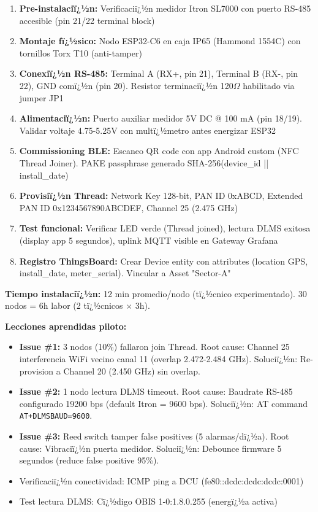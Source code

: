 \begin{enumerate}
    \item \textbf{Pre-instalaciï¿½n:} Verificaciï¿½n medidor Itron SL7000 con puerto RS-485 accesible (pin 21/22 terminal block)
    \item \textbf{Montaje fï¿½sico:} Nodo ESP32-C6 en caja IP65 (Hammond 1554C) con tornillos Torx T10 (anti-tamper)
    \item \textbf{Conexiï¿½n RS-485:} Terminal A (RX+, pin 21), Terminal B (RX-, pin 22), GND comï¿½n (pin 20). Resistor terminaciï¿½n 120$\Omega$ habilitado via jumper JP1
    \item \textbf{Alimentaciï¿½n:} Puerto auxiliar medidor 5V DC @ 100 mA (pin 18/19). Validar voltaje 4.75-5.25V con multï¿½metro antes energizar ESP32
    \item \textbf{Commissioning BLE:} Escaneo QR code con app Android custom (NFC Thread Joiner). PAKE passphrase generado SHA-256(device\_id || install\_date)
    \item \textbf{Provisiï¿½n Thread:} Network Key 128-bit, PAN ID 0xABCD, Extended PAN ID 0x1234567890ABCDEF, Channel 25 (2.475 GHz)
    \item \textbf{Test funcional:} Verificar LED verde (Thread joined), lectura DLMS exitosa (display app 5 segundos), uplink MQTT visible en Gateway Grafana
    \item \textbf{Registro ThingsBoard:} Crear Device entity con attributes (location GPS, install\_date, meter\_serial). Vincular a Asset "Sector-A"
\end{enumerate}

\textbf{Tiempo instalaciï¿½n:} 12 min promedio/nodo (tï¿½cnico experimentado). 30 nodos = 6h labor (2 tï¿½cnicos $\times$ 3h).

\textbf{Lecciones aprendidas piloto:}

\begin{itemize}
    \item \textbf{Issue \#1:} 3 nodos (10\%) fallaron join Thread. Root cause: Channel 25 interferencia WiFi vecino canal 11 (overlap 2.472-2.484 GHz). Soluciï¿½n: Re-provision a Channel 20 (2.450 GHz) sin overlap.
    \item \textbf{Issue \#2:} 1 nodo lectura DLMS timeout. Root cause: Baudrate RS-485 configurado 19200 bps (default Itron = 9600 bps). Soluciï¿½n: AT command \texttt{AT+DLMSBAUD=9600}.
    \item \textbf{Issue \#3:} Reed switch tamper false positives (5 alarmas/dï¿½a). Root cause: Vibraciï¿½n puerta medidor. Soluciï¿½n: Debounce firmware 5 segundos (reduce false positive 95\%).
    \item Verificaciï¿½n conectividad: ICMP ping a DCU (fe80::dcdc:dcdc:dcdc:0001)
    \item Test lectura DLMS: Cï¿½digo OBIS 1-0:1.8.0.255 (energï¿½a activa)
\end{itemize}

